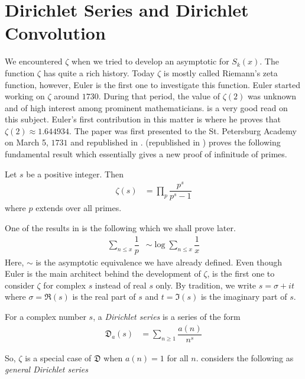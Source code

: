 \documentclass[elemannt.tex]{subfile}
\begin{document}
	\section{Dirichlet Series and Dirichlet Convolution}\label{sec:zeta}
	We encountered $\zeta$ when we tried to develop an asymptotic for $S_{k}(x)$. The function $\zeta$ has quite a rich history. Today $\zeta$ is mostly called Riemann's zeta function, however, Euler is the first one to investigate this function. Euler started working on $\zeta$ around $1730$. During that period, the value of $\zeta(2)$ was unknown and of high interest among prominent mathematicians. \textcite{ayoub_1974} is a very good read on this subject. Euler's first contribution in this matter is \textcite{euler_1738} where he proves that $\zeta(2)\approx 1.644934$. The paper was first presented to the St. Petersburg Academy on March 5, $1731$ and republished in \textcite{euler_2020_a}. \textcite{euler_1744} (republished in \textcite{euler_2020_b}) proves the following fundamental result which essentially gives a new proof of infinitude of primes.
		\begin{theorem}
			Let $s$ be a positive integer. Then
				\begin{align*}
					\zeta(s)
						& = \prod_{p}\dfrac{p^{s}}{p^{s}-1}
				\end{align*}
			where $p$ extends over all primes.
		\end{theorem}
	One of the results in \textcite{euler_1744} is the following which we shall prove later.
		\begin{align*}
			\sum_{n\leq x}\dfrac{1}{p}
			& \sim \log{\sum_{n\leq x}\dfrac{1}{x}}
		\end{align*}
	Here, $\sim$ is the asymptotic equivalence we have already defined. Even though Euler is the main architect behind the development of $\zeta$, \textcite{riemann_1859} is the first one to consider $\zeta$ for complex $s$ instead of real $s$ only. By tradition, we write $s=\sigma+it$ where $\sigma=\Re(s)$ is the real part of $s$ and $t=\Im(s)$ is the imaginary part of $s$.
		\begin{definition}
			For a complex number $s$, a \textit{Dirichlet series} is a series of the form
				\begin{align*}
					\mathfrak{D}_{a}(s)
						& = \sum_{n\geq 1}\dfrac{a(n)}{n^{s}}
				\end{align*}
		\end{definition}
	So, $\zeta$ is a special case of $\mathfrak{D}$ when $a(n)=1$ for all $n$. \textcite[$\S1$, Page $1$]{hardy_riesz_1915} considers the following as \textit{general Dirichlet series}
\end{document}
